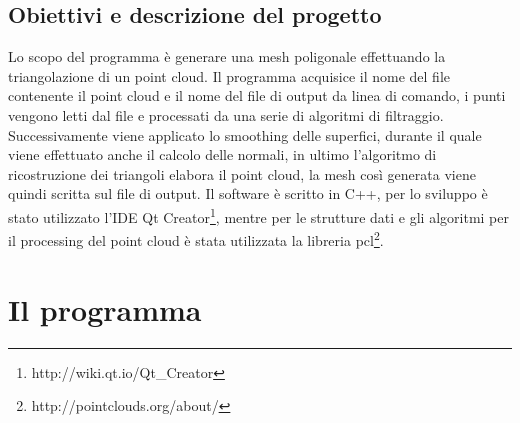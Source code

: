 \documentclass[a4paper,12pt]{article}
\begin{document}
	\subsection{Obiettivi e descrizione del progetto}
	Lo scopo del programma è generare una mesh poligonale effettuando la triangolazione di un point cloud.
	Il programma acquisice il nome del file contenente il point cloud e il nome del file di output da linea di comando,
	i punti vengono letti dal file e processati da una serie di algoritmi di filtraggio. 
	Successivamente viene applicato lo smoothing delle superfici, durante il quale viene effettuato anche il calcolo delle
	normali, in ultimo l'algoritmo di ricostruzione dei triangoli elabora il point cloud, la mesh così generata viene quindi
	scritta sul file di output.  
	Il software è scritto in C++, per lo sviluppo è stato utilizzato l'IDE Qt Creator\footnote{http://wiki.qt.io/Qt\_Creator},
	mentre per le strutture dati e gli algoritmi per il processing del point cloud è stata utilizzata la libreria
	pcl\footnote{http://pointclouds.org/about/}. 	
	
\clearpage
\section{Il programma}
\end{document}

